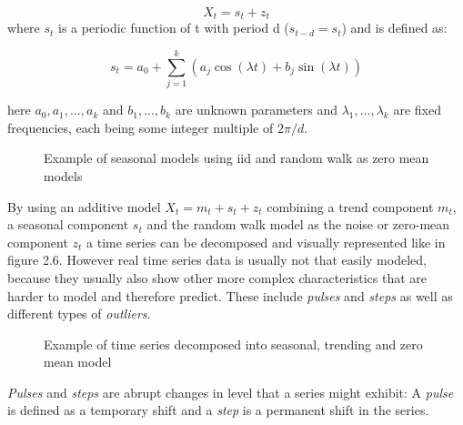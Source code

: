 \begin{equation}\label{eq:simple_seasonal_model}
	X_t = s_t + z_t
\end{equation}
where \(s_t\) is a periodic function of t with period d (\(s_{t-d}= s_t\)) and is defined as: 


\begin{equation}\label{eq:harmonic_regression}
	s_t = a_0 + \displaystyle\sum_{j=1}^{k} (a_j \cos(\lambda t) + b_j \sin(\lambda t ))
\end{equation}

here \(a_0, a_1, . . . , a_k\) and \(b_1, . . . , b_k\) are unknown parameters and \(\lambda_1, . . . , \lambda_k\) are fixed frequencies, each being some integer multiple of \(2\pi/d\).

\begin{figure}[ht]
	\centering
	\caption{Example of seasonal models using \acs{iid} and random walk as zero mean models}
\end{figure}

By using an additive model \(X_t= m_t + s_t + z_t\) combining a trend component \(m_t\), a seasonal component \(s_t\) and the random walk model as the noise or zero-mean component \(z_t\) a time series can be decomposed and visually represented like in figure 2.6. However real time series data is usually not that easily modeled, because they usually also show other more complex characteristics that are harder to model and therefore predict. These include \textit{pulses} and \textit{steps} as well as different types of \textit{outliers}.

\begin{figure}[ht]
	\centering
	\caption{Example of time series decomposed into seasonal, trending and zero mean model}
\end{figure}
\textit{Pulses} and \textit{steps} are abrupt changes in level that a series might exhibit:
A \textit{pulse} is defined as a temporary shift and a \textit{step} is a permanent shift in the series.

